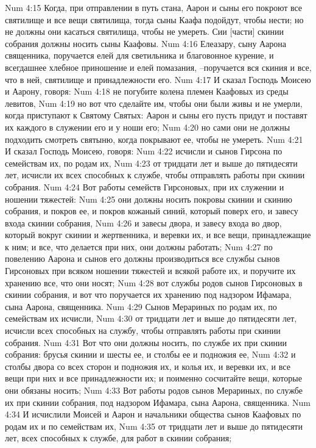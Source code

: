 Num 4:15  Когда, при отправлении в путь стана, Аарон и сыны его покроют все святилище и все вещи святилища, тогда сыны Каафа подойдут, чтобы нести; но не должны они касаться святилища, чтобы не умереть. Сии [части] скинии собрания должны носить сыны Каафовы.
Num 4:16  Елеазару, сыну Аарона священника, поручается елей для светильника и благовонное курение, и всегдашнее хлебное приношение и елей помазания, --поручается вся скиния и все, что в ней, святилище и принадлежности его.
Num 4:17  И сказал Господь Моисею и Аарону, говоря:
Num 4:18  не погубите колена племен Каафовых из среды левитов,
Num 4:19  но вот что сделайте им, чтобы они были живы и не умерли, когда приступают к Святому Святых: Аарон и сыны его пусть придут и поставят их каждого в служении его и у ноши его;
Num 4:20  но сами они не должны подходить смотреть святыню, когда покрывают ее, чтобы не умереть.
Num 4:21  И сказал Господь Моисею, говоря:
Num 4:22  исчисли и сынов Гирсона по семействам их, по родам их,
Num 4:23  от тридцати лет и выше до пятидесяти лет, исчисли их всех способных к службе, чтобы отправлять работы при скинии собрания.
Num 4:24  Вот работы семейств Гирсоновых, при их служении и ношении тяжестей:
Num 4:25  они должны носить покровы скинии и скинию собрания, и покров ее, и покров кожаный синий, который поверх его, и завесу входа скинии собрания,
Num 4:26  и завесы двора, и завесу входа во двор, который вокруг скинии и жертвенника, и веревки их, и все вещи, принадлежащие к ним; и все, что делается при них, они должны работать;
Num 4:27  по повелению Аарона и сынов его должны производиться все службы сынов Гирсоновых при всяком ношении тяжестей и всякой работе их, и поручите их хранению все, что они носят;
Num 4:28  вот службы родов сынов Гирсоновых в скинии собрания, и вот что поручается их хранению под надзором Ифамара, сына Аарона, священника.
Num 4:29  Сынов Мерариных по родам их, по семействам их исчисли,
Num 4:30  от тридцати лет и выше до пятидесяти лет, исчисли всех способных на службу, чтобы отправлять работы при скинии собрания.
Num 4:31  Вот что они должны носить, по службе их при скинии собрания: брусья скинии и шесты ее, и столбы ее и подножия ее,
Num 4:32  и столбы двора со всех сторон и подножия их, и колья их, и веревки их, и все вещи при них и все принадлежности их; и поименно сосчитайте вещи, которые они обязаны носить;
Num 4:33  Вот работы родов сынов Мерариных, по службе их при скинии собрания, под надзором Ифамара, сына Аарона, священника.
Num 4:34  И исчислили Моисей и Аарон и начальники общества сынов Каафовых по родам их и по семействам их,
Num 4:35  от тридцати лет и выше до пятидесяти лет, всех способных к службе, для работ в скинии собрания;
